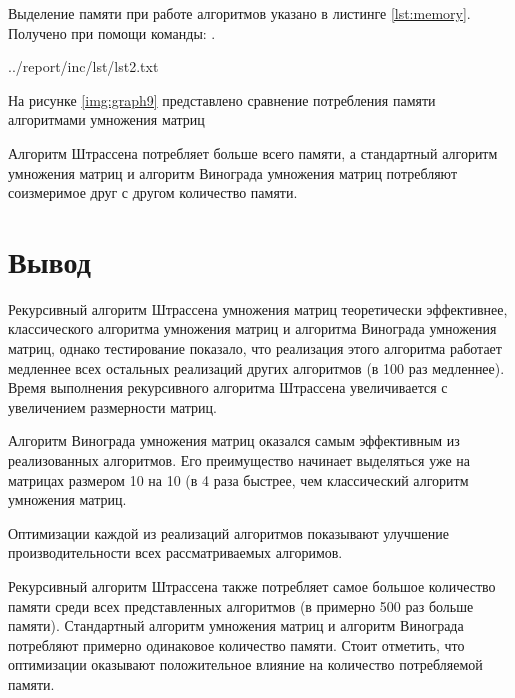 Выделение памяти при работе алгоритмов указано в листинге \ref{lst:memory}. Получено при помощи команды: .

\newpage

\begin{lstinputlisting}[
	caption={Использование памяти},
	label={lst:memory},
	style={sh},
	linerange{1-14},
	]{../report/inc/lst/lst2.txt}
\end{lstinputlisting}

\newpage

На рисунке \ref{img:graph9} представлено сравнение потребления памяти алгоритмами умножения матриц


Алгоритм Штрассена потребляет больше всего памяти, а стандартный алгоритм умножения матриц и алгоритм Винограда умножения матриц потребляют соизмеримое друг с другом количество памяти.

\pagebreak

\section*{Вывод}

Рекурсивный алгоритм Штрассена умножения матриц теоретически эффективнее, классического алгоритма умножения матриц и алгоритма Винограда умножения матриц, однако тестирование показало, что реализация этого алгоритма работает медленнее всех остальных реализаций других алгоритмов (в 100 раз медленнее). Время выполнения рекурсивного алгоритма Штрассена увеличивается с увеличением размерности матриц.

Алгоритм Винограда умножения матриц оказался самым эффективным из реализованных алгоритмов. Его преимущество начинает выделяться уже на матрицах размером 10 на 10 (в 4 раза быстрее, чем классический алгоритм умножения матриц.

Оптимизации каждой из реализаций алгоритмов показывают улучшение производительности всех рассматриваемых алгоримов.

Рекурсивный алгоритм Штрассена также потребляет самое большое количество памяти среди всех представленных алгоритмов (в примерно 500 раз больше памяти). Стандартный алгоритм умножения матриц и алгоритм Винограда потребляют примерно одинаковое количество памяти. Стоит отметить, что оптимизации оказывают положительное влияние на количество потребляемой памяти.


